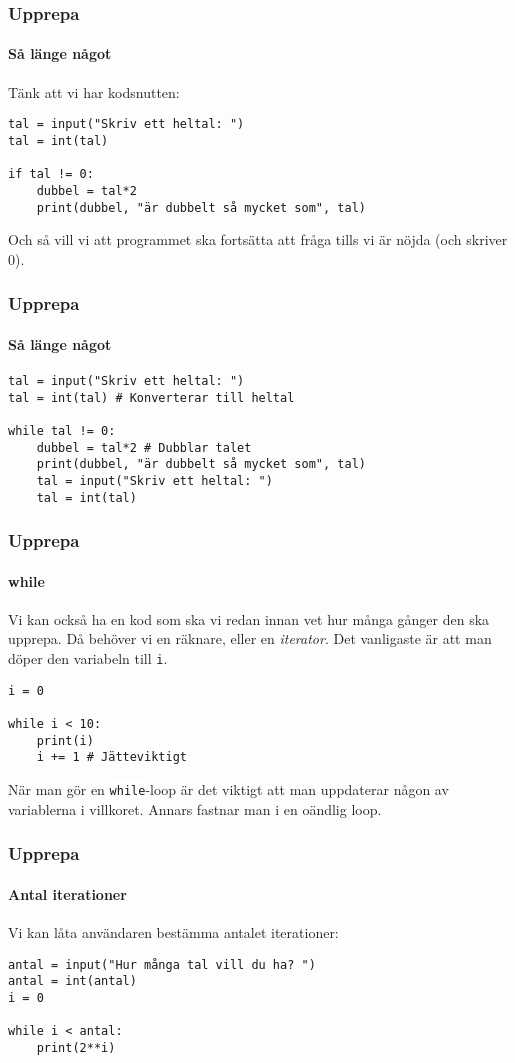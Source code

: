 \documentclass[aspectratio=169]{beamer}
\newcommand{\code}[1]{\colorbox{white}{\lstinline{#1}}}
\begin{document}
\begin{frame}[fragile]
	\frametitle{Upprepa}
	\framesubtitle{Så länge något}
	
	Tänk att vi har kodsnutten:
	
	\begin{lstlisting}
tal = input("Skriv ett heltal: ")
tal = int(tal)

if tal != 0:
    dubbel = tal*2
    print(dubbel, "är dubbelt så mycket som", tal)
	\end{lstlisting}
	
	Och så vill vi att programmet ska fortsätta att fråga tills vi är nöjda (och skriver 0).
	
\end{frame}

\begin{frame}[fragile]
	\frametitle{Upprepa}
	\framesubtitle{Så länge något}
	
	\begin{lstlisting}
tal = input("Skriv ett heltal: ")
tal = int(tal) # Konverterar till heltal

while tal != 0:
    dubbel = tal*2 # Dubblar talet
    print(dubbel, "är dubbelt så mycket som", tal)
    tal = input("Skriv ett heltal: ")
    tal = int(tal)
	\end{lstlisting}
	
\end{frame}

\begin{frame}[fragile]
	\frametitle{Upprepa}
	\framesubtitle{while}
	
	Vi kan också ha en kod som ska vi redan innan vet hur många gånger den ska upprepa. Då behöver vi en räknare, eller en \textit{iterator}. Det vanligaste är att man döper den variabeln till \code{i}.
	
	\begin{lstlisting}
i = 0

while i < 10:
    print(i)
    i += 1 # Jätteviktigt
	\end{lstlisting}
	
	När man gör en \code{while}-loop är det viktigt att man uppdaterar någon av variablerna i villkoret. Annars fastnar man i en oändlig loop.

\end{frame}

\begin{frame}[fragile]
	\frametitle{Upprepa}
	\framesubtitle{Antal iterationer}
	
	Vi kan låta användaren bestämma antalet iterationer:
	
	\begin{lstlisting}
antal = input("Hur många tal vill du ha? ")
antal = int(antal)
i = 0

while i < antal:
    print(2**i)
	\end{lstlisting}
	
\end{frame}
\end{document}
